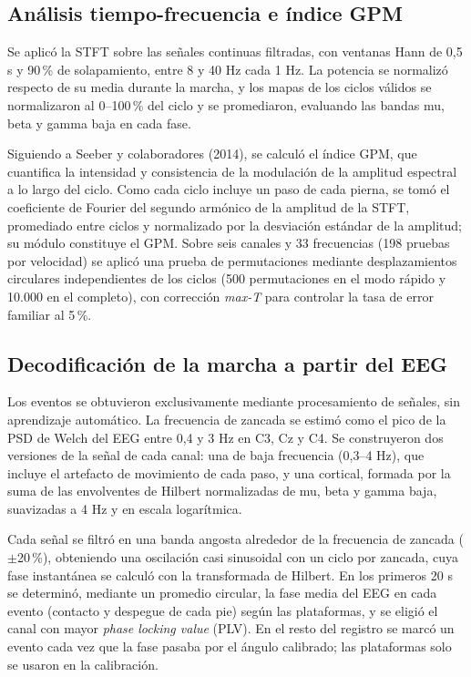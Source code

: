 \documentclass[10pt]{article}
\begin{document}
\subsection{Análisis tiempo-frecuencia e índice GPM}

Se aplicó la STFT sobre las señales continuas filtradas, con ventanas Hann de 0,5 s y 90\,\% de solapamiento, entre 8 y 40 Hz cada 1 Hz. La potencia se normalizó respecto de su media durante la marcha, y los mapas de los ciclos válidos se normalizaron al 0--100\,\% del ciclo y se promediaron, evaluando las bandas mu, beta y gamma baja en cada fase.

Siguiendo a Seeber y colaboradores (2014), se calculó el índice GPM, que cuantifica la intensidad y consistencia de la modulación de la amplitud espectral a lo largo del ciclo. Como cada ciclo incluye un paso de cada pierna, se tomó el coeficiente de Fourier del segundo armónico de la amplitud de la STFT, promediado entre ciclos y normalizado por la desviación estándar de la amplitud; su módulo constituye el GPM. Sobre seis canales y 33 frecuencias (198 pruebas por velocidad) se aplicó una prueba de permutaciones mediante desplazamientos circulares independientes de los ciclos (500 permutaciones en el modo rápido y 10.000 en el completo), con corrección \textit{max-T} para controlar la tasa de error familiar al 5\,\%.

\subsection{Decodificación de la marcha a partir del EEG}

Los eventos se obtuvieron exclusivamente mediante procesamiento de señales, sin aprendizaje automático. La frecuencia de zancada se estimó como el pico de la PSD de Welch del EEG entre 0,4 y 3 Hz en C3, Cz y C4. Se construyeron dos versiones de la señal de cada canal: una de baja frecuencia (0,3--4 Hz), que incluye el artefacto de movimiento de cada paso, y una cortical, formada por la suma de las envolventes de Hilbert normalizadas de mu, beta y gamma baja, suavizadas a 4 Hz y en escala logarítmica.

Cada señal se filtró en una banda angosta alrededor de la frecuencia de zancada ($\pm$20\,\%), obteniendo una oscilación casi sinusoidal con un ciclo por zancada, cuya fase instantánea se calculó con la transformada de Hilbert. En los primeros 20 s se determinó, mediante un promedio circular, la fase media del EEG en cada evento (contacto y despegue de cada pie) según las plataformas, y se eligió el canal con mayor \textit{phase locking value} (PLV). En el resto del registro se marcó un evento cada vez que la fase pasaba por el ángulo calibrado; las plataformas solo se usaron en la calibración.
\end{document}
